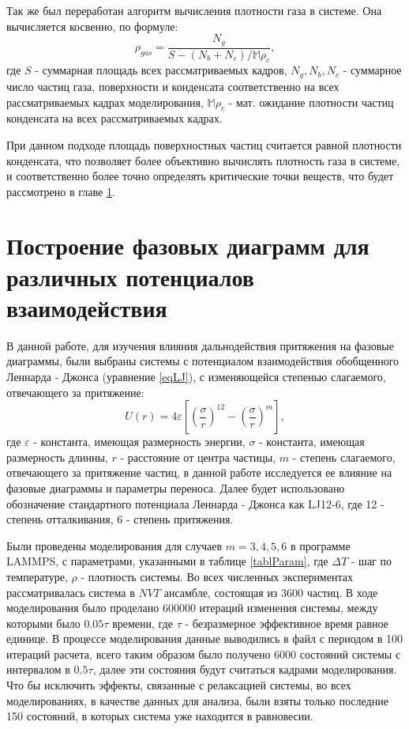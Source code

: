 Так же был переработан алгоритм вычисления плотности газа в системе. Она вычисляется косвенно, по формуле:
\begin{equation}
\rho_{gas} = \frac{N_{g}}{S - (N_{b} + N_{c}) / \mathbb{M}\rho_c},
\label{eqGas}
\end{equation}
где $S$ - суммарная площадь всех рассматриваемых кадров, $N_g, N_b, N_c$ - суммарное число частиц газа, поверхности и конденсата соответственно на всех рассматриваемых кадрах моделирования, $\mathbb{M}\rho_c$ - мат. ожидание плотности частиц конденсата на всех рассматриваемых кадрах.

При данном подходе площадь поверхностных частиц считается равной плотности конденсата, что позволяет более объективно вычислять плотность газа в системе, и соответственно более точно определять критические точки веществ, что будет рассмотрено в главе \ref{C2_2}.

\section{Построение фазовых диаграмм для различных потенциалов взаимодействия}\label{C2_2}

В данной работе, для изучения влияния дальнодействия притяжения на фазовые диаграммы, были выбраны системы с потенциалом взаимодействия обобщенного Леннарда - Джонса (уравнение \ref{eqLJ}), с изменяющейся степенью слагаемого, отвечающего за притяжение:
\begin{equation}
U(r) = 4\varepsilon \left[ \left(\frac{\sigma}{r}\right)^{12} - \left(\frac{\sigma}{r}\right)^{m} \right],
\label{eqLJ}
\end{equation}
где $\varepsilon$ - константа, имеющая размерность энергии, $\sigma$ - константа, имеющая размерность длинны, $r$ - расстояние от центра частицы, $m$ - степень слагаемого, отвечающего за притяжение частиц, в данной работе исследуется ее влияние на фазовые диаграммы и параметры переноса. Далее будет использовано обозначение стандартного потенциала Леннарда - Джонса как LJ12-6, где 12 - степень отталкивания, 6 - степень притяжения.

Были проведены моделирования для случаев $m = 3, 4, 5, 6$ в программе LAMMPS, с параметрами, указанными в таблице \ref{tablParam}, где $\Delta T$ - шаг по температуре,  $\rho$ - плотность системы. Во всех численных экспериментах рассматривалась система в $NVT$ ансамбле, состоящая из 3600 частиц. В ходе моделирования было проделано 600000 итераций изменения системы, между которыми было $0.05\tau$ времени, где $\tau$ - безразмерное эффективное время равное единице. В процессе моделирования данные выводились в файл с периодом в 100 итераций расчета, всего таким образом было получено 6000 состояний системы с интервалом в $0.5\tau$, далее эти состояния будут считаться кадрами моделирования. Что бы исключить эффекты, связанные с релаксацией системы, во всех моделированиях, в качестве данных для анализа, были взяты только последние 150 состояний, в которых система уже находится в равновесии.

